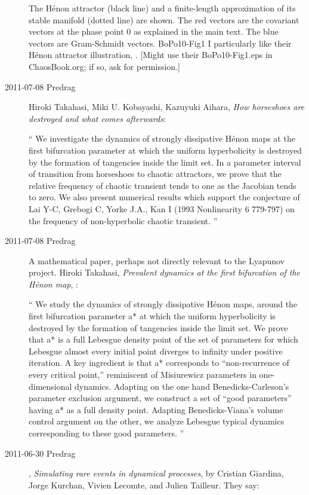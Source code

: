 \begin{description}
%
 {}{
The H\'enon attractor (black line) and a finite-length approximation of
its stable manifold (dotted line) are shown. The red vectors are the
covariant vectors at the phase point 0 as explained in the main text. The
blue vectors are Gram-Schmidt vectors.
}{BoPo10-Fig1}
%
I particularly like their H\'enon attractor illustration,
. [Might use their BoPo10-Fig1.eps in ChaosBook.org;
if so, ask for permission.]

\item[2011-07-08 Predrag]
Hiroki Takahasi, Miki U. Kobayashi, Kazuyuki Aihara,
\emph{How horseshoes are destroyed and what comes afterwards}:

``
We investigate the dynamics of strongly dissipative H\'enon maps at the
first bifurcation parameter at which the uniform hyperbolicity is
destroyed by the formation of tangencies inside the limit set. In a
parameter interval of transition from horseshoes to chaotic attractors,
we prove that the relative frequency of chaotic transient tends to one as
the Jacobian tends to zero. We also present numerical results which
support the conjecture of Lai Y-C, Grebogi C, Yorke J.A., Kan I (1993
Nonlinearity 6 779-797) on the frequency of non-hyperbolic chaotic
transient.
''

\item[2011-07-08 Predrag]
A mathematical paper, perhaps not directly relevant to the Lyapunov
project.
Hiroki Takahasi,
\emph{Prevalent dynamics at the first bifurcation of the H\'enon map},
:

``
We study the dynamics of strongly dissipative H\'enon maps, around the
first bifurcation parameter a* at which the uniform hyperbolicity is
destroyed by the formation of tangencies inside the limit set. We prove
that a* is a full Lebesgue density point of the set of parameters for
which Lebesgue almost every initial point diverges to infinity under
positive iteration. A key ingredient is that a* corresponds to
``non-recurrence of every critical point,'' reminiscent of Misiurewicz
parameters in one-dimensional dynamics. Adapting on the one hand
Benedicks-Carleson's parameter exclusion argument, we construct a set
of ``good parameters'' having a* as a full density point. Adapting
Benedicks-Viana's volume control argument on the other, we analyze
Lebesgue typical dynamics corresponding to these good parameters.
''

\item[2011-06-30 Predrag] ,
\emph{Simulating rare events in dynamical processes},
by Cristian Giardina, Jorge Kurchan, Vivien Lecomte,
and Julien Tailleur. They say:


\end{description}
